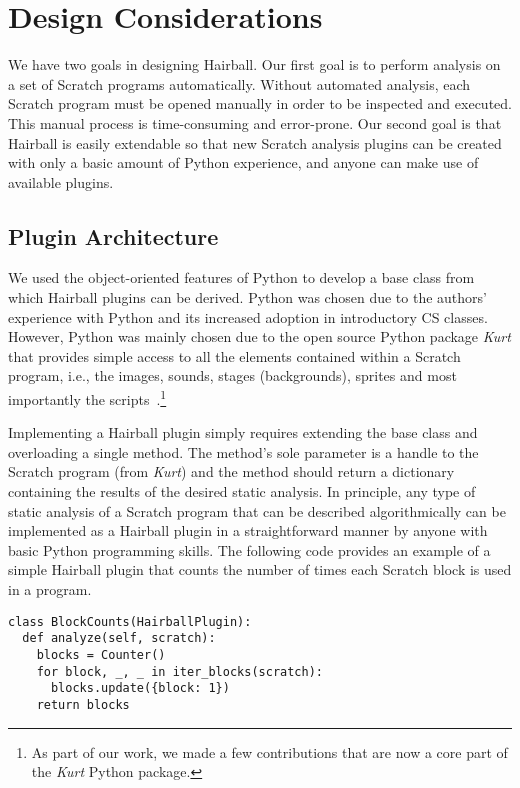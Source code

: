 \section{Design Considerations}

We have two goals in designing Hairball. Our first goal is to perform analysis
on a set of Scratch programs automatically.  Without automated analysis, each
Scratch program must be opened manually in order to be inspected and executed.
This manual process is time-consuming and error-prone.  Our second goal is that
Hairball is easily extendable so that new Scratch analysis plugins can be
created with only a basic amount of Python experience, and anyone can make use
of available plugins.


\subsection*{Plugin Architecture}
We used the object-oriented features of Python to develop a base class from
which Hairball plugins can be derived. Python was chosen due to the authors'
experience with Python and its increased adoption in introductory CS
classes. However, Python was mainly chosen due to the open source Python
package \emph{Kurt} that provides simple access to all the elements contained
within a Scratch program, i.e., the images, sounds, stages (backgrounds),
sprites and most importantly the scripts~\cite{Radvan:2012:Online}.\footnote{As
  part of our work, we made a few contributions that are now a core part of the
  \emph{Kurt} Python package.}

Implementing a Hairball plugin simply requires extending the base class and
overloading a single method. The method's sole parameter is a handle to the
Scratch program (from \emph{Kurt}) and the method should return a dictionary
containing the results of the desired static analysis. In principle, any type
of static analysis of a Scratch program that can be described algorithmically
can be implemented as a Hairball plugin in a straightforward manner by anyone
with basic Python programming skills. The following code provides an example of
a simple Hairball plugin that counts the number of times each Scratch block is
used in a program.

\begin{verbatim}
class BlockCounts(HairballPlugin):
  def analyze(self, scratch):
    blocks = Counter()
    for block, _, _ in iter_blocks(scratch):
      blocks.update({block: 1})
    return blocks
\end{verbatim}
